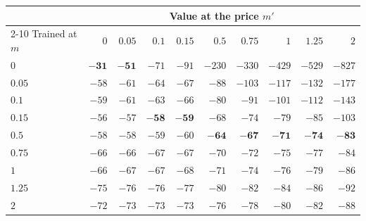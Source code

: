 \begin{tabular}{lrrrrrrrrr}
\toprule
 & \multicolumn{9}{c}{Value at the price $m'$} \\
\cmidrule(lr){2-10}
Trained at $m$ & $0$ & $0.05$ & $0.1$ & $0.15$ & $0.5$ & $0.75$ & $1$ & $1.25$ & $2$ \\
\midrule
$0$ & $\mathbf{-31}$ & $\mathbf{-51}$ & $-71$ & $-91$ & $-230$ & $-330$ & $-429$ & $-529$ & $-827$ \\
$0.05$ & $-58$ & $-61$ & $-64$ & $-67$ & $-88$ & $-103$ & $-117$ & $-132$ & $-177$ \\
$0.1$ & $-59$ & $-61$ & $-63$ & $-66$ & $-80$ & $-91$ & $-101$ & $-112$ & $-143$ \\
$0.15$ & $-56$ & $-57$ & $\mathbf{-58}$ & $\mathbf{-59}$ & $-68$ & $-74$ & $-79$ & $-85$ & $-103$ \\
$0.5$ & $-58$ & $-58$ & $-59$ & $-60$ & $\mathbf{-64}$ & $\mathbf{-67}$ & $\mathbf{-71}$ & $\mathbf{-74}$ & $\mathbf{-83}$ \\
$0.75$ & $-66$ & $-66$ & $-67$ & $-67$ & $-70$ & $-72$ & $-75$ & $-77$ & $-84$ \\
$1$ & $-66$ & $-67$ & $-67$ & $-68$ & $-71$ & $-74$ & $-76$ & $-79$ & $-86$ \\
$1.25$ & $-75$ & $-76$ & $-76$ & $-77$ & $-80$ & $-82$ & $-84$ & $-86$ & $-92$ \\
$2$ & $-72$ & $-73$ & $-73$ & $-73$ & $-76$ & $-78$ & $-80$ & $-82$ & $-88$ \\
\bottomrule
\end{tabular}
